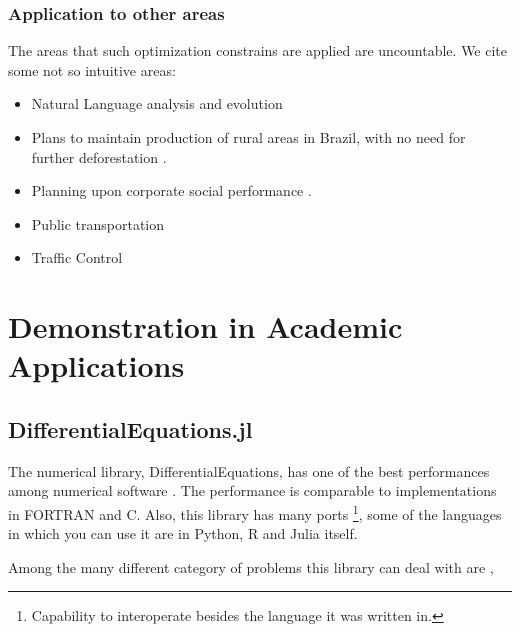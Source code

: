 \documentclass[
12pt,				%
openright,			%
oneside,			%
a4paper,			%
brazil,				%
english,			%
]{abntex2}
\begin{document}
\subsubsection{Application to other areas}

The areas that such optimization constrains are applied are
uncountable. We cite some not so intuitive areas:

\begin{itemize}
\item Natural Language analysis and evolution \cite{potts2010harmonic,
  heinz2018computational}
\item Plans to maintain production of rural areas in Brazil, with no
  need for further deforestation \cite{costa2018socio}.
\item Planning upon corporate social performance
  \cite{chen2011measuring,jacobs2016operational}.
\item Public transportation \cite{schiewe2020integrated} 
\item Traffic Control \cite{delle2019feedback}
\end{itemize}

\section{Demonstration in Academic Applications}

\subsection{DifferentialEquations.jl}

The numerical library, DifferentialEquations, has one of the best
performances among numerical software
\cite{rackauckas2017differentialequations}. The performance is
comparable to implementations in FORTRAN and C. Also, this library has
many ports \footnote{Capability to interoperate besides the language it
was written in.}, some of the languages in which you can use it are in Python, R and Julia itself.

Among the many different category of problems this library can deal
with are \cite{rackauckas2019confederated,rackauckas2017adaptive,rackauckas_stability-optimized_2018,sykora2020stochasticdelaydiffeq,rackauckas2018comparison,rackauckas2019diffeqflux,rackauckas2020universal,gowda2019sparsity,ma2021modelingtoolkit},
\end{document}
